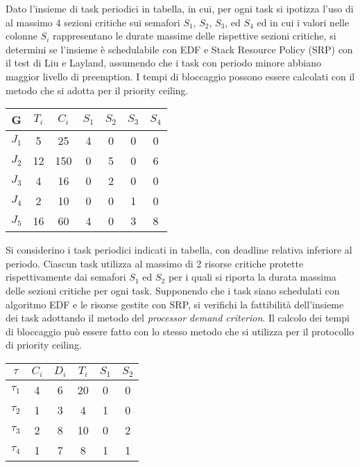 \begin{Esercizio4}

Dato l'insieme di task periodici in tabella, in cui, per ogni task si ipotizza 
l'uso di al massimo 4 sezioni critiche sui semafori $S_1$, $S_2$, $S_3$, ed $S_4$ 
ed in cui i valori nelle colonne $S_i$ rappresentano le durate massime delle 
rispettive sezioni critiche, si determini se l'insieme è schedulabile con EDF 
e Stack Resource Policy (SRP) con il test di Liu e Layland, assumendo che i task 
con periodo minore abbiano maggior livello di preemption. I tempi di bloccaggio 
possono essere calcolati con il metodo che si adotta per il priority ceiling.

\begin{table}[H]
\centering
\begin{tabular}{|c|c|c|c|c|c|c|}
\hline
G & $T_i$ & $C_i$ & $S_1$ & $S_2$ & $S_3$ & $S_4$ \\
\hline
$J_1$ & 5 & 25 & 4 & 0 & 0 & 0 \\
\hline
$J_2$ & 12 & 150 & 0 & 5 & 0 & 6 \\
\hline
$J_3$ & 4 & 16 & 0 & 2 & 0 & 0 \\
\hline
$J_4$ & 2 & 10 & 0 & 0 & 1 & 0 \\
\hline
$J_5$ & 16 & 60 & 4 & 0 & 3 & 8 \\
\hline
\end{tabular}
\label{tab:task_esercizio3}
\end{table}


\end{Esercizio4}



\begin{Esercizio5}

Si considerino i task periodici indicati in tabella, con deadline relativa inferiore 
al periodo. Ciascun task utilizza al massimo di 2 risorse critiche protette 
rispettivamente dai semafori $S_1$ ed $S_2$ per i quali si riporta la durata massima 
delle sezioni critiche per ogni task. Supponendo che i task siano schedulati con 
algoritmo EDF e le risorse gestite con SRP, si verifichi la fattibilità dell'insieme 
dei task adottando il metodo del \textit{processor demand criterion}. Il calcolo dei 
tempi di bloccaggio può essere fatto con lo stesso metodo che si utilizza per il 
protocollo di priority ceiling.

\begin{table}[H]
\centering
\begin{tabular}{|c|c|c|c|c|c|}
\hline
$\tau$ & $C_i$ & $D_i$ & $T_i$ & $S_1$ & $S_2$ \\
\hline
$\tau_1$ & 4 & 6 & 20 & 0 & 0 \\
\hline
$\tau_2$ & 1 & 3 & 4 & 1 & 0 \\
\hline
$\tau_3$ & 2 & 8 & 10 & 0 & 2 \\
\hline
$\tau_4$ & 1 & 7 & 8 & 1 & 1 \\
\hline
\end{tabular}
\label{tab:task_edf_srp}
\end{table}

\end{Esercizio5}



